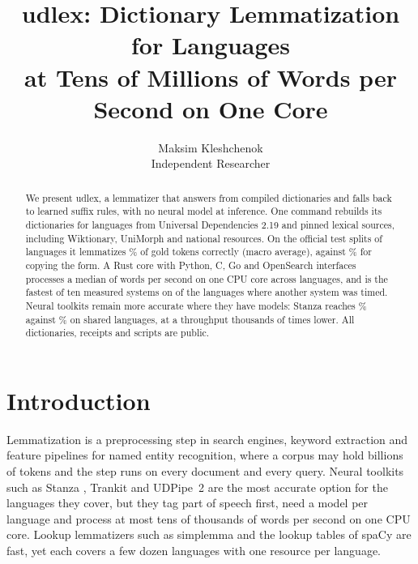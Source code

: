 \documentclass[11pt]{article}
\title{udlex: Dictionary Lemmatization for \relLangs{} Languages\\
at Tens of Millions of Words per Second on One Core}
\author{Maksim Kleshchenok \\
  Independent Researcher}
\begin{document}
\maketitle

\begin{abstract}
We present udlex, a lemmatizer that answers from compiled dictionaries and
falls back to learned suffix rules, with no neural model at inference. One
command rebuilds its dictionaries for \relLangs{} languages from Universal
Dependencies 2.19 and \relSources{} pinned lexical sources, including
Wiktionary, UniMorph and \relNational{} national resources. On the official
test splits of \accOffN{} languages it lemmatizes \accOffMacro\% of gold tokens
correctly (macro average), against \accOffCopy\% for copying the form. A
Rust core with Python, C, Go and OpenSearch interfaces processes a median of
\speedRsOneMedian{} words per second on one CPU core across \speedLangs{}
languages, and is the fastest of ten measured systems on \speedRsFastestLangs{}
of the \speedRivalLangs{} languages where another system was timed. Neural
toolkits remain more accurate where they have models: Stanza reaches
\accstanzaTheirs\% against \accstanzaOurs\% on \accstanzaN{} shared languages,
at a throughput thousands of times lower. All dictionaries, receipts and scripts
are public.
\end{abstract}

\section{Introduction}

Lemmatization is a preprocessing step in search engines, keyword extraction
and feature pipelines for named entity recognition, where a corpus may hold
billions of tokens and the step runs on every document and every query.
Neural toolkits such as Stanza \citep{qi-etal-2020-stanza}, Trankit
\citep{nguyen-etal-2021-trankit} and UDPipe~2 \citep{straka-2018-udpipe} are
the most accurate option for the languages they cover, but they tag
part of speech first, need a model per language and process at most tens
of thousands of words per second on one CPU core. Lookup lemmatizers such as simplemma
\citep{barbaresi-simplemma} and the lookup tables of spaCy
\citep{honnibal-2020-spacy} are fast, yet each covers a few dozen
languages with one resource per language.
\end{document}
